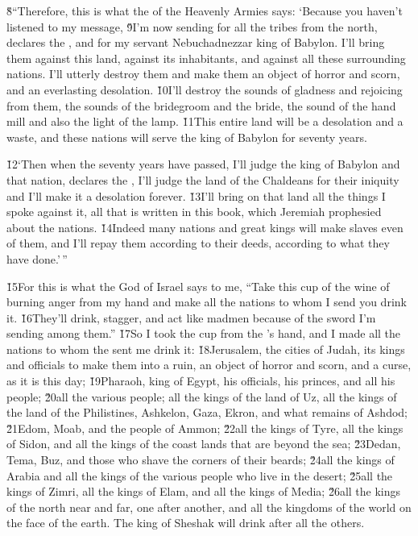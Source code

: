 \v{8}``Therefore, this is what the  of the Heavenly Armies says: `Because you haven't listened to my message, \v{9}I'm now sending for all the tribes from the north, declares the , and for my servant Nebuchadnezzar king of Babylon. I'll bring them against this land, against its inhabitants, and against all these surrounding nations. I'll utterly destroy them and make them an object of horror and scorn, and an everlasting desolation. \v{10}I'll destroy the sounds of gladness and rejoicing from them, the sounds of the bridegroom and the bride, the sound of the hand mill and also the light of the lamp. \v{11}This entire land will be a desolation and a waste, and these nations will serve the king of Babylon for seventy years.

\v{12}`Then when the seventy years have passed, I'll judge the king of Babylon and that nation, declares the , I'll judge the land of the Chaldeans for their iniquity and I'll make it a desolation forever. \v{13}I'll bring on that land all the things I spoke against it, all that is written in this book, which Jeremiah prophesied about the nations. \v{14}Indeed many nations and great kings will make slaves even of them, and I'll repay them according to their deeds, according to what they have done.'\,''

\v{15}For this is what the  God of Israel says to me, ``Take this cup of the wine of burning anger from my hand and make all the nations to whom I send you drink it. \v{16}They'll drink, stagger, and act like madmen because of the sword I'm sending among them.'' \v{17}So I took the cup from the 's hand, and I made all the nations to whom the  sent me drink it: \v{18}Jerusalem, the cities of Judah, its kings and officials to make them into a ruin, an object of horror and scorn, and a curse, as it is this day; \v{19}Pharaoh, king of Egypt, his officials, his princes, and all his people; \v{20}all the various people; all the kings of the land of Uz, all the kings of the land of the Philistines, Ashkelon, Gaza, Ekron, and what remains of Ashdod; \v{21}Edom, Moab, and the people of Ammon; \v{22}all the kings of Tyre, all the kings of Sidon, and all the kings of the coast lands that are beyond the sea; \v{23}Dedan, Tema, Buz, and those who shave the corners of their beards; \v{24}all the kings of Arabia and all the kings of the various people who live in the desert; \v{25}all the kings of Zimri, all the kings of Elam, and all the kings of Media; \v{26}all the kings of the north near and far, one after another, and all the kingdoms of the world on the face of the earth. The king of Sheshak will drink after all the others.


